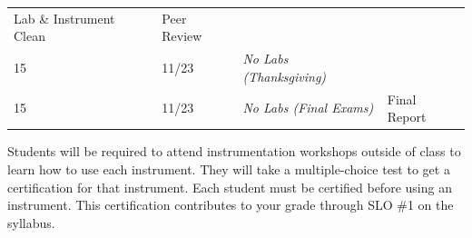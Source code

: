 \documentclass[]{tufte-book}
\begin{document}
\begin{longtable}[]{@{}llll@{}}
\begin{minipage}[t]{0.32\columnwidth}
Lab \& Instrument Clean\strut
\end{minipage} & \begin{minipage}[t]{0.40\columnwidth}\raggedright
Peer Review\strut
\end{minipage}\tabularnewline
\begin{minipage}[t]{0.04\columnwidth}\raggedright
15\strut
\end{minipage} & \begin{minipage}[t]{0.13\columnwidth}\raggedright
11/23\strut
\end{minipage} & \begin{minipage}[t]{0.32\columnwidth}\raggedright
\emph{No Labs (Thanksgiving)}\strut
\end{minipage} & \begin{minipage}[t]{0.40\columnwidth}\raggedright
\strut
\end{minipage}\tabularnewline
\begin{minipage}[t]{0.04\columnwidth}\raggedright
15\strut
\end{minipage} & \begin{minipage}[t]{0.13\columnwidth}\raggedright
11/23\strut
\end{minipage} & \begin{minipage}[t]{0.32\columnwidth}\raggedright
\emph{No Labs (Final Exams)}\strut
\end{minipage} & \begin{minipage}[t]{0.40\columnwidth}\raggedright
Final Report\strut
\end{minipage}\tabularnewline
\bottomrule
\end{longtable}

Students will be required to attend instrumentation workshops outside of class to learn how to use each instrument. They will take a multiple-choice test to get a certification for that instrument. Each student must be certified before using an instrument. This certification contributes to your grade through SLO \#1 on the syllabus.
\end{document}
